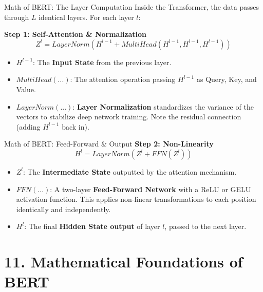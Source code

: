 \documentclass[aspectratio=169]{beamer}
\begin{document}
	\begin{frame}{Math of BERT: The Layer Computation}
		Inside the Transformer, the data passes through $L$ identical layers. For each layer $l$:
		
		\textbf{Step 1: Self-Attention \& Normalization}
		$$Z^l = LayerNorm(H^{l-1} + MultiHead(H^{l-1}, H^{l-1}, H^{l-1}))$$
		\begin{itemize}
			\item $H^{l-1}$: The \textbf{Input State} from the previous layer.
			\item $MultiHead(...)$: The attention operation passing $H^{l-1}$ as Query, Key, and Value.
			\item $LayerNorm(...)$: \textbf{Layer Normalization} standardizes the variance of the vectors to stabilize deep network training. Note the residual connection (adding $H^{l-1}$ back in).
		\end{itemize}
	\end{frame}
	
	\begin{frame}{Math of BERT: Feed-Forward \& Output}
		\textbf{Step 2: Non-Linearity}
		$$H^l = LayerNorm(Z^l + FFN(Z^l))$$
		\begin{itemize}
			\item $Z^l$: The \textbf{Intermediate State} outputted by the attention mechanism.
			\item $FFN(...)$: A two-layer \textbf{Feed-Forward Network} with a ReLU or GELU activation function. This applies non-linear transformations to each position identically and independently.
			\item $H^l$: The final \textbf{Hidden State output} of layer $l$, passed to the next layer.
		\end{itemize}
	\end{frame}
	
	\section{11. Mathematical Foundations of BERT}
	
\end{document}
